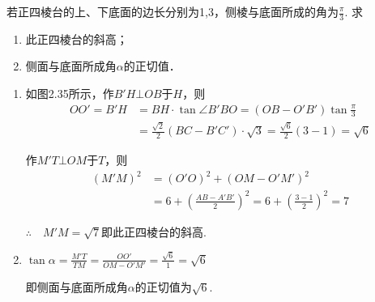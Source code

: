 \noindent
\begin{minipage}{.47\textwidth}
\begin{example}
    若正四棱台的上、下底面的边长分别为1,3，侧棱与底面所成的角为$\frac{\pi}{3}$. 求
\begin{enumerate}[(1)]
    \item 此正四棱台的斜高；
    \item 侧面与底面所成角$\alpha$的正切值．
\end{enumerate}
\end{example}
\end{minipage}
\hfill
\begin{minipage}{.51\textwidth}
\centering
{}
\end{minipage}



\begin{solution}
\begin{enumerate}[(1)]
    \item 如图2.35所示，作$B'H\bot OB$于$H$，则
\[\begin{split}
    OO'=B'H&=BH\cdot \tan\angle B'BO=(OB-O'B')\tan\frac{\pi}{3} \\
    &=\frac{\sqrt{2}}{2}(BC-B'C')\cdot \sqrt{3}=\frac{\sqrt{6}}{2}(3-1)=\sqrt{6}
\end{split} \]

作$M'T\bot OM$于$T$，则
\[\begin{split}
    (M'M)^2&=(O'O)^2+(OM-O'M')^2\\
    &=6+\left(\frac{AB-A'B'}{2}\right)^2=6+\left(\frac{3-1}{2}\right)^2=7
\end{split}\]

$\therefore\quad M'M=\sqrt{7}$即此正四棱台的斜高.

\item $\tan\alpha=\frac{M'T}{TM}=\frac{OO'}{OM-O'M'}=\frac{\sqrt{6}}{1}=\sqrt{6}$

即侧面与底面所成角$\alpha$的正切值为$\sqrt{6}$.
\end{enumerate}
\end{solution}

